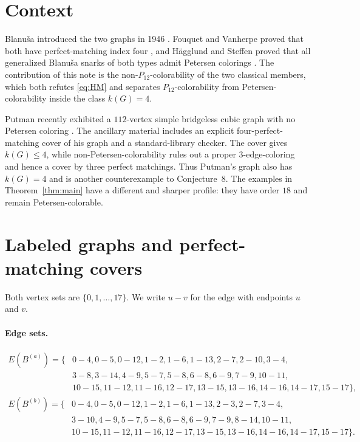 \documentclass[11pt]{amsart}
\newcommand{\Ba}{B^{(a)}}
\newcommand{\Bb}{B^{(b)}}
\newcommand{\uv}[2]{#1\!-\!#2}
\begin{document}
\section{Context}

Blanu\v{s}a introduced the two graphs in 1946 \cite{Blanusa1946}. Fouquet and
Vanherpe proved that both have perfect-matching index four
\cite{FouquetVanherpe2009}, and H\"agglund and Steffen proved that all
generalized Blanu\v{s}a snarks of both types admit Petersen colorings
\cite{HagglundSteffen2014}. The contribution of this note is the
non-$P_{12}$-colorability of the two classical members, which both refutes
\eqref{eq:HM} and separates $P_{12}$-colorability from Petersen-colorability
inside the class $k(G)=4$.

Putman recently exhibited a $112$-vertex simple bridgeless cubic graph with no
Petersen coloring \cite{Putman2026}. The ancillary material includes an explicit
four-perfect-matching cover of his graph and a standard-library checker. The
cover gives $k(G)\leq4$, while non-Petersen-colorability rules out a proper
$3$-edge-coloring and hence a cover by three perfect matchings. Thus Putman's
graph also has $k(G)=4$ and is another counterexample to Conjecture~8. The
examples in Theorem~\ref{thm:main} have a different and sharper profile: they
have order $18$ and remain Petersen-colorable.

\appendix
\section{Labeled graphs and perfect-matching covers}\label{app:data}

Both vertex sets are $\{0,1,\ldots,17\}$. We write $u-v$ for the edge with
endpoints $u$ and $v$.

\paragraph{Edge sets.}
\begingroup\footnotesize
\begin{align*}
E(\Ba)=\{&
\uv{0}{4},\uv{0}{5},\uv{0}{12},\uv{1}{2},\uv{1}{6},\uv{1}{13},
\uv{2}{7},\uv{2}{10},\uv{3}{4},\\
&\uv{3}{8},\uv{3}{14},\uv{4}{9},\uv{5}{7},\uv{5}{8},\uv{6}{8},
\uv{6}{9},\uv{7}{9},\uv{10}{11},\\
&\uv{10}{15},\uv{11}{12},\uv{11}{16},\uv{12}{17},\uv{13}{15},
\uv{13}{16},\uv{14}{16},\uv{14}{17},\uv{15}{17}\},
\end{align*}
\begin{align*}
E(\Bb)=\{&
\uv{0}{4},\uv{0}{5},\uv{0}{12},\uv{1}{2},\uv{1}{6},\uv{1}{13},
\uv{2}{3},\uv{2}{7},\uv{3}{4},\\
&\uv{3}{10},\uv{4}{9},\uv{5}{7},\uv{5}{8},\uv{6}{8},\uv{6}{9},
\uv{7}{9},\uv{8}{14},\uv{10}{11},\\
&\uv{10}{15},\uv{11}{12},\uv{11}{16},\uv{12}{17},\uv{13}{15},
\uv{13}{16},\uv{14}{16},\uv{14}{17},\uv{15}{17}\}.
\end{align*}
\endgroup
\end{document}
